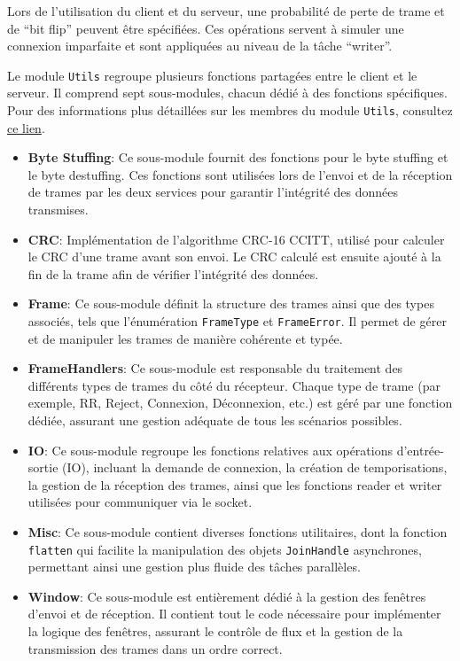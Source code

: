 \documentclass[french]{article}
\begin{document}
Lors de l’utilisation du client et du serveur, une probabilité de perte de trame et de “bit flip” peuvent être spécifiées. Ces opérations servent à simuler une connexion imparfaite et sont appliquées au niveau de la tâche “writer”.

Le module \texttt{Utils} regroupe plusieurs fonctions partagées entre le client et le serveur. Il comprend sept sous-modules, chacun dédié à des fonctions spécifiques. Pour des informations plus détaillées sur les membres du module \texttt{Utils}, consultez \href{https://ift3325.etiennecollin.com/utils/index.html}{ce lien}.

\begin{itemize}
    \item \textbf{Byte Stuffing}: Ce sous-module fournit des fonctions pour le byte stuffing et le byte destuffing. Ces fonctions sont utilisées lors de l'envoi et de la réception de trames par les deux services pour garantir l'intégrité des données transmises.
    \item \textbf{CRC}: Implémentation de l'algorithme CRC-16 CCITT, utilisé pour calculer le CRC d'une trame avant son envoi. Le CRC calculé est ensuite ajouté à la fin de la trame afin de vérifier l'intégrité des données.
    \item \textbf{Frame}: Ce sous-module définit la structure des trames ainsi que des types associés, tels que l'énumération \texttt{FrameType} et \texttt{FrameError}. Il permet de gérer et de manipuler les trames de manière cohérente et typée.
    \item \textbf{FrameHandlers}: Ce sous-module est responsable du traitement des différents types de trames du côté du récepteur. Chaque type de trame (par exemple, RR, Reject, Connexion, Déconnexion, etc.) est géré par une fonction dédiée, assurant une gestion adéquate de tous les scénarios possibles.
    \item \textbf{IO}: Ce sous-module regroupe les fonctions relatives aux opérations d'entrée-sortie (IO), incluant la demande de connexion, la création de temporisations, la gestion de la réception des trames, ainsi que les fonctions reader et writer utilisées pour communiquer via le socket.
    \item \textbf{Misc}: Ce sous-module contient diverses fonctions utilitaires, dont la fonction \texttt{flatten} qui facilite la manipulation des objets \texttt{JoinHandle} asynchrones, permettant ainsi une gestion plus fluide des tâches parallèles.
    \item \textbf{Window}: Ce sous-module est entièrement dédié à la gestion des fenêtres d’envoi et de réception. Il contient tout le code nécessaire pour implémenter la logique des fenêtres, assurant le contrôle de flux et la gestion de la transmission des trames dans un ordre correct.
\end{itemize}
\end{document}
